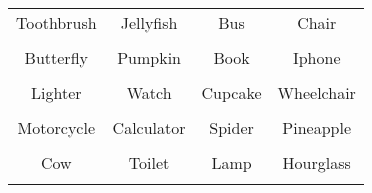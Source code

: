 \documentclass[12pt,a4paper]{article}
\begin{document}
\thispagestyle{empty}
\begin{table}[]
\centering
\Huge
\begin{tabular}{cccc}
 Toothbrush& Jellyfish& Bus& Chair\\  & & & \\
 Butterfly& Pumpkin& Book& Iphone\\  & & & \\
 Lighter& Watch& Cupcake& Wheelchair\\  & & & \\
 Motorcycle& Calculator& Spider& Pineapple\\  & & & \\
 Cow& Toilet& Lamp& Hourglass\\  & & & \\
\end{tabular}
\end{table}
\end{document}
